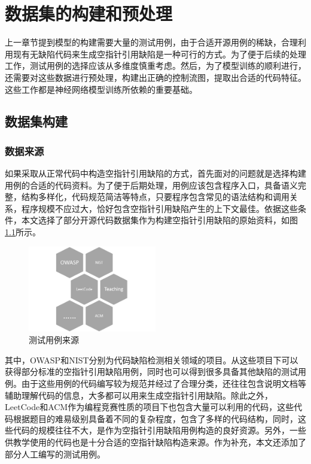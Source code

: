 \chapter{数据集的构建和预处理}

上一章节提到模型的构建需要大量的测试用例，由于合适开源用例的稀缺，合理利用现有无缺陷代码来生成空指针引用缺陷是一种可行的方式。为了便于后续的处理工作，测试用例的选择应该从多维度慎重考虑。然后，为了模型训练的顺利进行，还需要对这些数据进行预处理，构建出正确的控制流图，提取出合适的代码特征。这些工作都是神经网络模型训练所依赖的重要基础。

\section{数据集构建}
\subsection{数据来源}
如果采取从正常代码中构造空指针引用缺陷的方式，首先面对的问题就是选择构建用例的合适的代码资料。为了便于后期处理，用例应该包含程序入口，具备语义完整，结构多样化，代码规范简洁等特点，只要程序包含常见的语法结构和调用关系，程序规模不应过大，恰好包含空指针引用缺陷产生的上下文最佳。依据这些条件，本文选择了部分开源代码数据集作为构建空指针引用缺陷的原始资料，如图\ref{fig:figure4-1}所示。

\begin{figure}
	\centering
	\includegraphics[width=0.50\textwidth]{figures/resource4-1}
	\caption{测试用例来源}\label{fig:figure4-1}
\end{figure}

其中，OWASP和NIST分别为代码缺陷检测相关领域的项目。从这些项目下可以获得部分标准的空指针引用缺陷用例，同时也可以得到很多具备其他缺陷的测试用例。由于这些用例的代码编写较为规范并经过了合理分类，还往往包含说明文档等辅助理解代码的信息，大多都可以用来生成空指针引用缺陷。除此之外，LeetCode和ACM作为编程竞赛性质的项目下也包含大量可以利用的代码，这些代码根据题目的难易级别具备着不同的复杂程度，包含了多样的代码结构，同时，这些代码的规模往往不大，是作为空指针引用缺陷用例构造的良好资源。另外，一些供教学使用的代码也是十分合适的空指针缺陷构造来源。作为补充，本文还添加了部分人工编写的测试用例。

